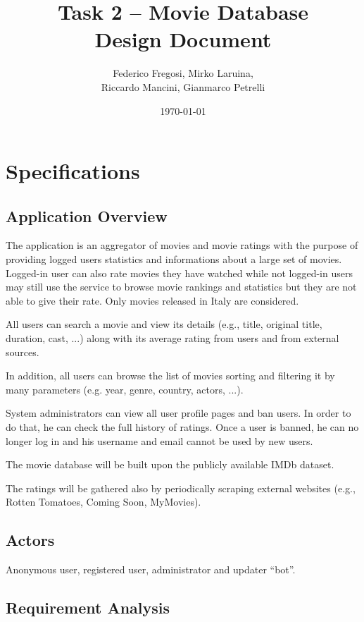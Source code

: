 \documentclass[11pt]{article}
\title{Task 2 -- Movie Database\\ 
	\Large Design Document}
\date{\today}
\author{Federico Fregosi, Mirko Laruina,\\
        Riccardo Mancini, Gianmarco Petrelli}
\begin{document}
\maketitle
\vfill
\setcounter{tocdepth}{2}
\tableofcontents
\vfill
\clearpage
\setcounter{page}{1}

\section{Specifications}

\subsection{Application Overview}
The application is an aggregator of movies and movie ratings with the purpose 
of providing logged users statistics and informations about a large set of movies.
Logged-in user can also rate movies they have watched while not logged-in users 
may still use the service to browse movie rankings and statistics but they are not
able to give their rate. Only movies released in Italy are considered.

All users can search a movie and view its details (e.g., title, original title, duration, 
cast, ...) along with its average rating from users and from external sources. 

In addition, all users can browse the list of movies sorting and filtering it by many parameters
(e.g. year, genre, country, actors, ...).

System administrators can view all user profile pages and ban users. In order to do that, he can 
check the full history of ratings. Once a user is banned, he can no longer log in and his username and email cannot be used by new users.

The movie database will be built upon the publicly available IMDb dataset.

The ratings will be gathered also by periodically scraping external websites 
(e.g., Rotten Tomatoes, Coming Soon, MyMovies).

\subsection{Actors}
Anonymous user, registered user, administrator and updater ``bot''.

\subsection{Requirement Analysis}
\end{document}
